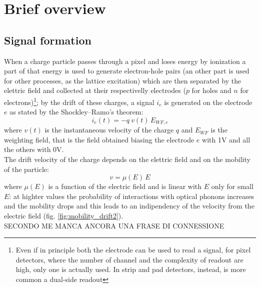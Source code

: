 \section{Brief overview}
   \subsection{Signal formation}
      When a charge particle passes through a pixel and loses energy by ionization a part of that energy is used to generate electron-hole pairs (an other part is used for other processes, as the lattice excitation) which are then separated by the elettric field and collected at their respectivelly electrodes ($p$ for holes and $n$ for electrons)\footnote{Even if in principle both the electrode can be used to read a signal, for pixel detectors, where the number of channel and the complexity of readout are high, only one is actually used. In strip and pad detectors, instead, is more common a dual-side readout}; by the drift of these charges, a signal $i_e$ is generated on the  electrode $e$ as stated by the Shockley–Ramo's theorem: 
      \begin{equation}
         i_e(t) = -q\: v(t)\, E_{WF,e}
      \end{equation}
      where $v(t)$ is the instantaneous velocity of the charge $q$ and $E_{WF}$ is the weighting field, that is the field obtained biasing the electrode $e$ with 1V and all the others with 0V.\\
      The drift velocity of the charge depends on the elettric field and on the mobility of the particle:
      \begin{equation}
         v = \mu(E)\, E
      \end{equation}
      where $\mu(E)$ is a function of the electric field and is linear with $E$ only for small $E$: at highter values the probability of interactions with optical phonons increases and the mobility drops and this leads to an indipendency of the velocity from the electric field (fig. \ref{fig:mobility_drift2}).\\
      SECONDO ME MANCA ANCORA UNA FRASE DI CONNESSIONE\\
